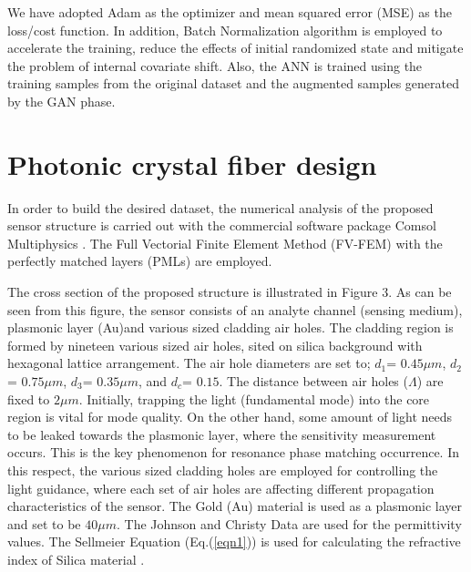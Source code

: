 \documentclass[journal]{IEEEtran}
\begin{document}
We have adopted Adam \cite{kingma2014adam}as the optimizer and mean squared error (MSE) as the loss/cost function. In addition, Batch Normalization algorithm \cite{ioffe2015batch} is employed to accelerate the training, reduce the effects of initial randomized state and mitigate the problem of internal covariate shift. Also, the ANN is trained using the training samples from the original dataset and the augmented samples generated by the GAN phase.

\section{Photonic crystal fiber design}
\label{sec:pcf}

In order to build the desired dataset, the numerical analysis of the proposed sensor structure is carried out with the commercial software package Comsol Multiphysics  \cite{comsol_help}. The Full Vectorial Finite Element Method (FV-FEM) with the perfectly matched layers (PMLs) \cite{koshiba2002full,saitoh2001full} are employed.

The cross section of the proposed structure is illustrated in Figure 3. As can be seen from this figure, the sensor consists of an analyte channel (sensing medium), plasmonic layer (Au)and various sized cladding air holes. The cladding region is formed by nineteen various sized air holes, sited on silica background with hexagonal lattice arrangement. The air hole diameters are set to;  $d_1$= $0.45 \mu m$, $d_2$= $0.75 \mu m$, $d_3$= $0.35 \mu m$, and  $d_c$= $0.15$. The distance between air holes ($\Lambda$) are fixed to $2 \mu m$. Initially, trapping the light (fundamental mode) into the core region is vital for mode quality. On the other hand, some amount of light needs to be leaked towards the plasmonic layer, where the sensitivity measurement occurs. This is the key phenomenon for resonance phase matching occurrence. In this respect, the various sized cladding holes are employed for controlling the light guidance, where each set of air holes are affecting different propagation characteristics of the sensor. The Gold (Au) material is used as a plasmonic layer and set to be $40 \mu m$. The Johnson and Christy Data \cite{johnson1972optical} are used for the permittivity values. The Sellmeier Equation (Eq.(\ref{eqn1})) is used for calculating the refractive index of Silica material \cite{bjarklev2003PCF}.
\end{document}
